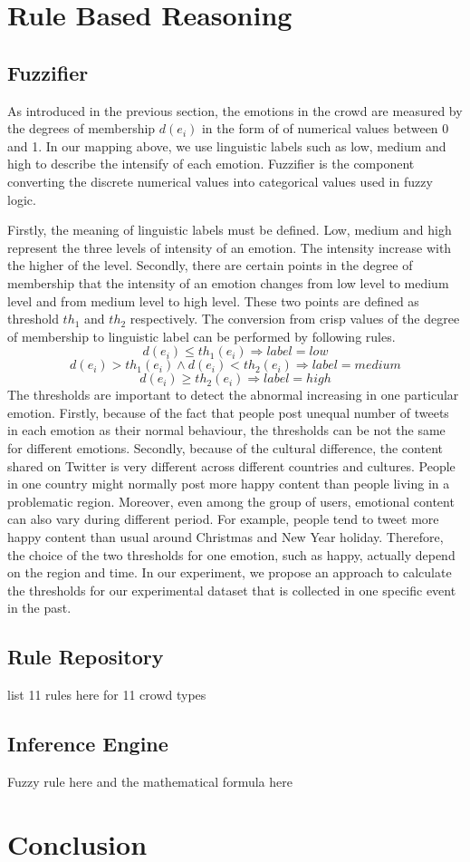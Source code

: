 \section{Rule Based Reasoning}

\subsection{Fuzzifier}
As introduced in the previous section, the emotions in the crowd are measured by the degrees of membership \(d(e_i)\) in the form of of numerical values between 0 and 1. In our mapping above, we use linguistic labels such as low, medium and high to describe the intensify of each emotion. Fuzzifier is the component converting the discrete numerical values into categorical values used in fuzzy logic. 

Firstly, the meaning of linguistic labels must be defined. Low, medium and high represent the three levels of intensity of an emotion. The intensity increase with the higher of the level. Secondly, there are certain points in the degree of membership that the intensity of an emotion changes from low level to medium level and from medium level to high level. These two points are defined as threshold \(th_1\) and \(th_2\) respectively. The conversion from crisp values of the degree of membership to linguistic label can be performed by following rules.
\[
d(e_i) \leq th_1(e_i) \Rightarrow label = low
\]
\[
d(e_i) > th_1(e_i) \land d(e_i) < th_2(e_i) \Rightarrow label = medium
\]
\[
d(e_i) \geq th_2(e_i) \Rightarrow label = high
\]
The thresholds are important to detect the abnormal increasing in one particular emotion. Firstly, because of the fact that people post unequal number of tweets in each emotion as their normal behaviour, the thresholds can be not the same for different emotions. Secondly, because of the cultural difference, the content shared on Twitter is very different across different countries and cultures. People in one country might normally post more happy content than people living in a problematic region. Moreover, even among the group of users, emotional content can also vary during different period. For example, people tend to tweet more happy content than usual around Christmas and New Year holiday. Therefore, the choice of the two thresholds for one emotion, such as happy, actually depend on the region and time. In our experiment, we propose an approach to calculate the thresholds for our experimental dataset that is collected in one specific event in the past.

\subsection{Rule Repository}

list 11 rules here for 11 crowd types

\subsection{Inference Engine}

Fuzzy rule here and the mathematical formula here

\section{Conclusion}